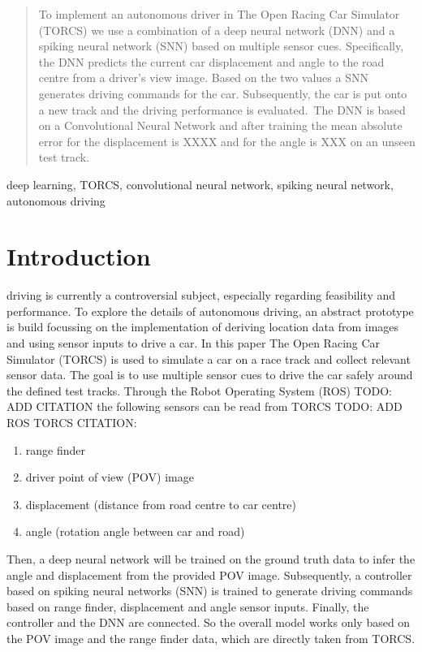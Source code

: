 \documentclass[10pt,a4paper,twoside,journal]{IEEEtran}
\begin{document}
\begin{abstract}
	To implement an autonomous driver in The Open Racing Car Simulator (TORCS)
	we use a combination of a deep neural network (DNN) and a spiking neural network (SNN) based on multiple
	sensor cues. Specifically, the DNN predicts the current car displacement
	and angle to the road centre from a driver's view image. Based on the two values
	a SNN generates driving commands for the car. Subsequently, the car is put onto a 
	new track and the driving performance is evaluated.\
	The DNN is based on a Convolutional Neural Network and after training the mean 
	absolute error for the displacement is XXXX and for the angle is XXX on an
	unseen test track.
\end{abstract}

\begin{IEEEkeywords}
	deep learning, TORCS, convolutional neural network, spiking neural network, autonomous driving
\end{IEEEkeywords}

%
%
\section{Introduction}
\label{sc:intro}

 driving is currently a controversial subject, especially 
regarding feasibility and performance. To explore the details of autonomous driving, an abstract prototype is build focussing on the  implementation of deriving location data from images and using sensor inputs to drive a car.
In this paper The Open Racing Car Simulator (TORCS) is used
to simulate a car on a race track and collect relevant sensor data. The goal is to use multiple sensor cues to drive the car safely around the defined test tracks. Through the Robot Operating System (ROS) TODO: ADD CITATION the following sensors can be read from TORCS TODO: ADD ROS TORCS CITATION: 
\begin{enumerate}
	\item range finder
	\item driver point of view (POV) image
	\item displacement (distance from road centre to car centre)
	\item angle (rotation angle between car and road)
\end{enumerate}
Then, a deep neural network will be trained on the ground truth data to infer the angle and displacement from the provided POV image. Subsequently, a controller based on spiking neural networks (SNN) is trained to generate driving commands based on range finder, displacement and angle sensor inputs. Finally, the controller and the DNN are connected. So the overall model works only based on the POV image and the range finder data, which are directly taken from TORCS.
\end{document}
